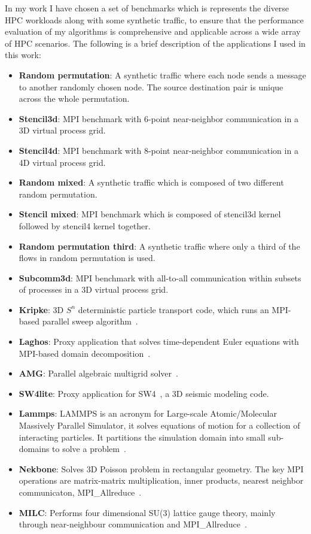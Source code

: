 In my work I have chosen a set of benchmarks which is represents the diverse HPC workloads along with some synthetic traffic, to ensure that the performance evaluation of my algorithms is comprehensive and applicable across a wide array of HPC scenarios.
The following is a brief description of the applications I used in this work:

\begin{itemize}
\item \textbf{Random permutation}: A synthetic traffic where each node sends a message to another randomly chosen node. The source destination pair is unique across the whole permutation.
\item \textbf{Stencil3d}: MPI benchmark with 6-point near-neighbor communication in a 3D virtual process grid.
\item \textbf{Stencil4d}: MPI benchmark with 8-point near-neighbor communication in a 4D virtual process grid.
\item \textbf{Random mixed}: A synthetic traffic which is composed of two different random permutation.
\item \textbf{Stencil mixed}: MPI benchmark which is composed of stencil3d kernel followed by stencil4 kernel together.
\item \textbf{Random permutation third}: A synthetic traffic where only a third of the flows in random permutation is used. 
\item \textbf{Subcomm3d}: MPI benchmark with all-to-all communication within subsets of processes in a 3D virtual process grid.
\item \textbf{Kripke}: 3D $S^n$ deterministic particle transport code, which runs an MPI-based parallel sweep algorithm~\cite{kripke}. 
\item \textbf{Laghos}: Proxy application that solves time-dependent Euler equations with MPI-based domain decomposition~\cite{laghos}.
\item \textbf{AMG}:  Parallel algebraic multigrid solver~\cite{amg}.
\item \textbf{SW4lite}: Proxy application for SW4~\cite{sjogreen2018sw4}, a 3D seismic modeling code.
\item \textbf{Lammps}: LAMMPS is an acronym for Large-scale Atomic/Molecular Massively Parallel Simulator, it solves equations of motion for a collection of interacting particles. It partitions the simulation domain into small sub-domains to solve a problem~\cite{thompson2022lammps}.
\item \textbf{Nekbone}: Solves 3D Poisson problem in rectangular geometry. The key MPI operations are matrix-matrix multiplication, inner products, nearest neighbor communicaton, MPI\_Allreduce~\cite{gong2016nekbone}.
\item \textbf{MILC}: Performs four dimensional SU(3) lattice gauge theory, mainly through near-neighbour communication and MPI\_Allreduce~\cite{gottlieb2001benchmarking}.
\end{itemize}

